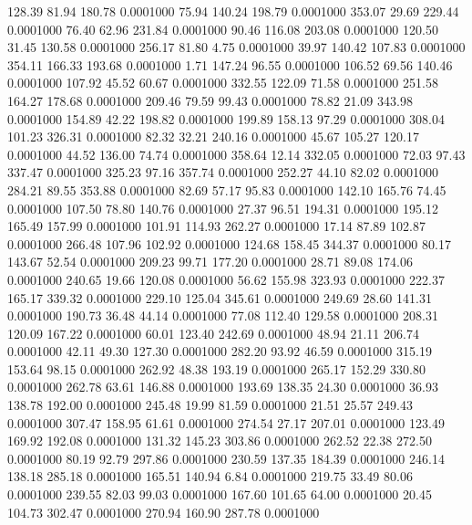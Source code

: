  128.39   81.94  180.78   0.0001000
  75.94  140.24  198.79   0.0001000
 353.07   29.69  229.44   0.0001000
  76.40   62.96  231.84   0.0001000
  90.46  116.08  203.08   0.0001000
 120.50   31.45  130.58   0.0001000
 256.17   81.80    4.75   0.0001000
  39.97  140.42  107.83   0.0001000
 354.11  166.33  193.68   0.0001000
   1.71  147.24   96.55   0.0001000
 106.52   69.56  140.46   0.0001000
 107.92   45.52   60.67   0.0001000
 332.55  122.09   71.58   0.0001000
 251.58  164.27  178.68   0.0001000
 209.46   79.59   99.43   0.0001000
  78.82   21.09  343.98   0.0001000
 154.89   42.22  198.82   0.0001000
 199.89  158.13   97.29   0.0001000
 308.04  101.23  326.31   0.0001000
  82.32   32.21  240.16   0.0001000
  45.67  105.27  120.17   0.0001000
  44.52  136.00   74.74   0.0001000
 358.64   12.14  332.05   0.0001000
  72.03   97.43  337.47   0.0001000
 325.23   97.16  357.74   0.0001000
 252.27   44.10   82.02   0.0001000
 284.21   89.55  353.88   0.0001000
  82.69   57.17   95.83   0.0001000
 142.10  165.76   74.45   0.0001000
 107.50   78.80  140.76   0.0001000
  27.37   96.51  194.31   0.0001000
 195.12  165.49  157.99   0.0001000
 101.91  114.93  262.27   0.0001000
  17.14   87.89  102.87   0.0001000
 266.48  107.96  102.92   0.0001000
 124.68  158.45  344.37   0.0001000
  80.17  143.67   52.54   0.0001000
 209.23   99.71  177.20   0.0001000
  28.71   89.08  174.06   0.0001000
 240.65   19.66  120.08   0.0001000
  56.62  155.98  323.93   0.0001000
 222.37  165.17  339.32   0.0001000
 229.10  125.04  345.61   0.0001000
 249.69   28.60  141.31   0.0001000
 190.73   36.48   44.14   0.0001000
  77.08  112.40  129.58   0.0001000
 208.31  120.09  167.22   0.0001000
  60.01  123.40  242.69   0.0001000
  48.94   21.11  206.74   0.0001000
  42.11   49.30  127.30   0.0001000
 282.20   93.92   46.59   0.0001000
 315.19  153.64   98.15   0.0001000
 262.92   48.38  193.19   0.0001000
 265.17  152.29  330.80   0.0001000
 262.78   63.61  146.88   0.0001000
 193.69  138.35   24.30   0.0001000
  36.93  138.78  192.00   0.0001000
 245.48   19.99   81.59   0.0001000
  21.51   25.57  249.43   0.0001000
 307.47  158.95   61.61   0.0001000
 274.54   27.17  207.01   0.0001000
 123.49  169.92  192.08   0.0001000
 131.32  145.23  303.86   0.0001000
 262.52   22.38  272.50   0.0001000
  80.19   92.79  297.86   0.0001000
 230.59  137.35  184.39   0.0001000
 246.14  138.18  285.18   0.0001000
 165.51  140.94    6.84   0.0001000
 219.75   33.49   80.06   0.0001000
 239.55   82.03   99.03   0.0001000
 167.60  101.65   64.00   0.0001000
  20.45  104.73  302.47   0.0001000
 270.94  160.90  287.78   0.0001000
